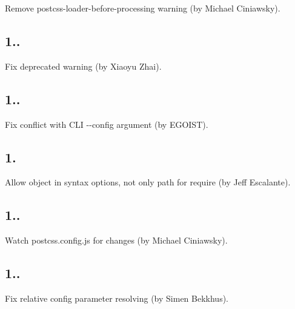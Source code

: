 \begin{DoxyItemize}
\item Remove {\ttfamily postcss-\/loader-\/before-\/processing} warning (by Michael Ciniawsky).
\end{DoxyItemize}

\subsection*{1..}


\begin{DoxyItemize}
\item Fix deprecated warning (by Xiaoyu Zhai).
\end{DoxyItemize}

\subsection*{1..}


\begin{DoxyItemize}
\item Fix conflict with C\+LI {\ttfamily -\/-\/config} argument (by E\+G\+O\+I\+ST).
\end{DoxyItemize}

\subsection*{1.}


\begin{DoxyItemize}
\item Allow object in syntax options, not only path for require (by Jeff Escalante).
\end{DoxyItemize}

\subsection*{1..}


\begin{DoxyItemize}
\item Watch {\ttfamily postcss.\+config.\+js} for changes (by Michael Ciniawsky).
\end{DoxyItemize}

\subsection*{1..}


\begin{DoxyItemize}
\item Fix relative {\ttfamily config} parameter resolving (by Simen Bekkhus).
\end{DoxyItemize}

